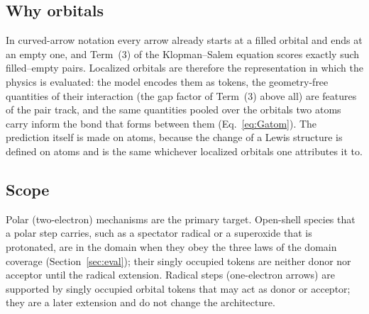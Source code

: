 \documentclass[11pt,a4paper]{article}
\begin{document}
\subsection{Why orbitals}
In curved-arrow notation every arrow already starts at a filled orbital and ends at an empty one, and Term~(3) of the Klopman--Salem equation scores exactly such filled--empty pairs. Localized orbitals are therefore the representation in which the physics is evaluated: the model encodes them as tokens, the geometry-free quantities of their interaction (the gap factor of Term~(3) above all) are features of the pair track, and the same quantities pooled over the orbitals two atoms carry inform the bond that forms between them (Eq.~\eqref{eq:Gatom}). The prediction itself is made on atoms, because the change of a Lewis structure is defined on atoms and is the same whichever localized orbitals one attributes it to.

\subsection{Scope}
Polar (two-electron) mechanisms are the primary target. Open-shell species that a polar step carries, such as a spectator radical or a superoxide that is protonated, are in the domain when they obey the three laws of the domain coverage (Section~\ref{sec:eval}); their singly occupied tokens are neither donor nor acceptor until the radical extension. Radical steps (one-electron arrows) are supported by singly occupied orbital tokens that may act as donor or acceptor; they are a later extension and do not change the architecture.
\end{document}
